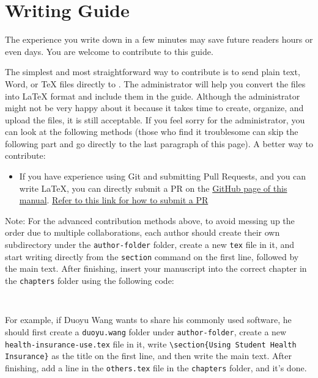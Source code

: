 \chapter{Writing Guide}
\label{chapter.author-ins}


The experience you write down in a few minutes may save future readers hours or even days. You are welcome to contribute to this guide.

The simplest and most straightforward way to contribute is to send plain text, Word, or TeX files directly to \Shiyao. The administrator will help you convert the files into \LaTeX{} format and include them in the guide. Although the administrator might not be very happy about it because it takes time to create, organize, and upload the files, it is still acceptable. If you feel sorry for the administrator, you can look at the following methods (those who find it troublesome can skip the following part and go directly to the last paragraph of this page). A better way to contribute:

\begin{itemize}
    \item If you have experience using Git and submitting Pull Requests, and you can write \LaTeX{}, you can directly submit a PR on the \href{https://github.com/xp-pgrs-unofficial-guide/xp_pgrs_unofficial_guide}{GitHub page of this manual}. \href{https://www.zhihu.com/question/21682976/answer/79489643}{Refer to this link for how to submit a PR}
\end{itemize} 

\vspace{5mm}
Note: For the advanced contribution methods above, to avoid messing up the order due to multiple collaborations, each author should create their own subdirectory under the \texttt{author-folder} folder, create a new \texttt{tex} file in it, and start writing directly from the \texttt{section} command on the first line, followed by the main text. After finishing, insert your manuscript into the correct chapter in the \texttt{chapters} folder using the following code:
\begin{lstlisting}
    
\end{lstlisting} 
For example, if Duoyu Wang wants to share his commonly used software, he should first create a \texttt{duoyu.wang} folder under \texttt{author-folder}, create a new \texttt{health-insurance-use.tex} file in it, write \lstinline[breaklines=true]!\section{Using Student Health Insurance}! as the title on the first line, and then write the main text. After finishing, add a line \lstinline[breaklines=true]!! in the \texttt{others.tex} file in the \texttt{chapters} folder, and it's done.

